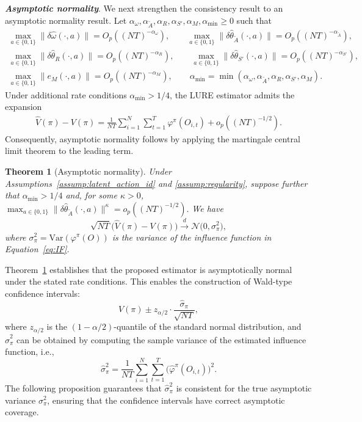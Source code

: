 \documentclass[12pt]{article}
\newcommand{\Var}{{\mbox{Var}}}
\newcommand{\0}{\boldsymbol{0}}
\newtheorem{theorem}{Theorem}
\begin{document}
\textbf{\textit{Asymptotic normality}}. We next strengthen the consistency result to an asymptotic normality result. Let $\alpha_\omega,\alpha_{\widetilde A},\alpha_R,\alpha_{S'},\alpha_M, \alpha_{\min} \geq 0$ such that
\[
\begin{gathered}
\max_{a\in\{0,1\}}\|\delta \widehat \omega(\cdot,a)\|=O_p((NT)^{-\alpha_\omega}),\qquad
\max_{a\in\{0,1\}}\|\delta \widehat \theta_{\widetilde A}(\cdot,a)\|
    =O_p((NT)^{-\alpha_{\widetilde A}}), \\
\max_{a\in\{0,1\}}\|\delta \widehat \theta_R(\cdot,a)\|=O_p((NT)^{-\alpha_R}),\qquad
\max_{a\in\{0,1\}}\|\delta \widehat \theta_{S'}(\cdot,a)\|
    =O_p((NT)^{-\alpha_{S'}}), \\
\max_{a\in\{0,1\}}\|e_M(\cdot,a)\|=O_p((NT)^{-\alpha_M}), \qquad \alpha_{\min}=\min\left(\alpha_\omega,\alpha_{\widetilde A},\alpha_R,\alpha_{S'},\alpha_M\right).
\end{gathered}
\]
Under additional rate conditions $\alpha_{\min}>1/4$, the LURE estimator admits the expansion
\begin{align*}
\widehat V(\pi)-V(\pi)
=
\frac{1}{NT} \sum_{i=1}^N\sum_{t=1}^T
\varphi^\pi(O_{i,t})
+o_p((NT)^{-1/2}).
\end{align*} Consequently, asymptotic normality follows by applying the martingale central limit theorem \citep{mcleish1974dependent} to the leading term.




\begin{theorem}[Asymptotic normality]
\label{thm:asymptotic_normality}
Under Assumptions~\ref{assump:latent_action_id} and \ref{assump:regularity}, suppose further that $\alpha_{\min}>1/4$ and, for some $\kappa>0$, $\max_{a\in\{0,1\}}\|\delta \widehat \theta_{\widetilde A}(\cdot,a)\|^\kappa=o_p((NT)^{-1/2}).$
We have
\[
\sqrt{NT}\big(\widehat V(\pi) - V(\pi)\big) \xrightarrow{d} \mathcal{N}\big(0,\sigma^2_\pi\big),
\]
where $\sigma^2_\pi = \Var(\varphi^\pi(O))$ is the variance of the influence function in Equation~\eqref{eq:IF}.
\end{theorem}



Theorem~\ref{thm:asymptotic_normality} establishes that the proposed estimator is asymptotically normal under the stated rate conditions. This enables the construction of Wald-type confidence intervals:
\[
\widehat V(\pi) \pm z_{\alpha/2} \cdot \frac{\widehat\sigma_\pi}{\sqrt{NT}},
\]
where $z_{\alpha/2}$ is the $(1-\alpha/2)$-quantile of the standard normal distribution, and $\widehat\sigma_\pi^2$ can be obtained by computing the sample variance of the estimated influence function, i.e., \[
\widehat\sigma_\pi^2 = \frac{1}{NT}\sum_{i=1}^N\sum_{t=1}^T \big(\widehat\varphi^\pi(O_{i,t})\big)^2.
\] The following proposition guarantees that $\widehat\sigma_\pi^2$ is consistent for the true asymptotic variance $\sigma_\pi^2$, ensuring that the confidence intervals have correct asymptotic coverage.
\end{document}
